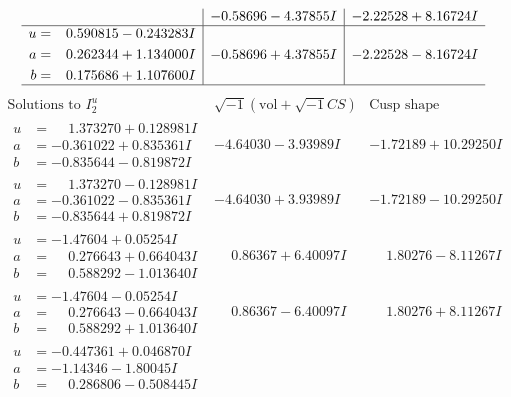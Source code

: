 \documentclass[1p]{elsarticle_modified}
\theoremstyle{definition}
\newcommand{\I}{\sqrt{-1}}
\begin{document}
$$\begin{array}{c|c|c}
 & -0.58696 - 4.37855 I & -2.22528 + 8.16724 I \\ \hline\begin{aligned}
u &= \phantom{-}0.590815 - 0.243283 I \\
a &= \phantom{-}0.262344 + 1.134000 I \\
b &= \phantom{-}0.175686 + 1.107600 I\end{aligned}
 & -0.58696 + 4.37855 I & -2.22528 - 8.16724 I\\
 \hline 
 \end{array}$$\newpage$$\begin{array}{c|c|c}  
\text{Solutions to }I^u_{2}& \I (\text{vol} + \sqrt{-1}CS) & \text{Cusp shape}\\
 \hline 
\begin{aligned}
u &= \phantom{-}1.373270 + 0.128981 I \\
a &= -0.361022 + 0.835361 I \\
b &= -0.835644 - 0.819872 I\end{aligned}
 & -4.64030 - 3.93989 I & -1.72189 + 10.29250 I \\ \hline\begin{aligned}
u &= \phantom{-}1.373270 - 0.128981 I \\
a &= -0.361022 - 0.835361 I \\
b &= -0.835644 + 0.819872 I\end{aligned}
 & -4.64030 + 3.93989 I & -1.72189 - 10.29250 I \\ \hline\begin{aligned}
u &= -1.47604 + 0.05254 I \\
a &= \phantom{-}0.276643 + 0.664043 I \\
b &= \phantom{-}0.588292 - 1.013640 I\end{aligned}
 & \phantom{-}0.86367 + 6.40097 I & \phantom{-}1.80276 - 8.11267 I \\ \hline\begin{aligned}
u &= -1.47604 - 0.05254 I \\
a &= \phantom{-}0.276643 - 0.664043 I \\
b &= \phantom{-}0.588292 + 1.013640 I\end{aligned}
 & \phantom{-}0.86367 - 6.40097 I & \phantom{-}1.80276 + 8.11267 I \\ \hline\begin{aligned}
u &= -0.447361 + 0.046870 I \\
a &= -1.14346 - 1.80045 I \\
b &= \phantom{-}0.286806 - 0.508445 I\end{aligned}

\end{array}$$
\end{document}
